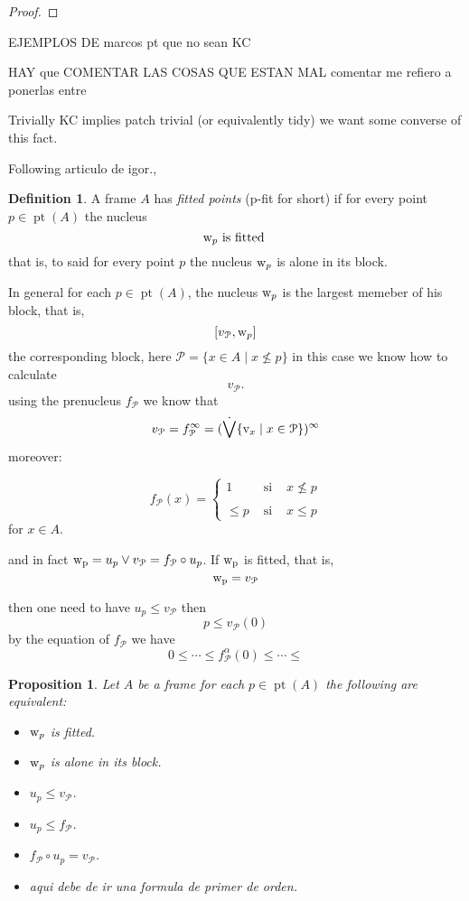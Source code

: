 \documentclass[11pt]{amsart}
\DeclareMathOperator{\pt}{pt}
\theoremstyle{plain}
\newtheorem{prop}[thm]{Proposition}
\theoremstyle{definition}
\newtheorem{dfn}[thm]{Definition}
\begin{document}
\begin{proof}



\end{proof}

EJEMPLOS DE marcos pt que no sean KC

HAY que COMENTAR LAS COSAS QUE ESTAN MAL comentar me refiero a ponerlas entre 

	



Trivially {\rm KC} implies patch trivial (or equivalently tidy) we want some converse of this fact.



Following articulo de igor.,

\begin{dfn}\label{pfit}
A frame $A$ has \emph{fitted points} ({\rm p-fit} for short) if for every point $p\in\pt(A)$ the nucleus \[{\rm w}_{p} \text{ is fitted }\]
that is, to said for every point $p$ the nucleus ${\rm w}_{p}$ is alone in its block.
\end{dfn}



In general for each $p\in\pt(A)$, the nucleus ${\rm w}_{p}$ is the largest memeber of his block, that is,
\[[v_{\mathcal{P}},{\rm w}_{p}]\] the corresponding block, here $\mathcal{P}=\{x\in A\mid x\nleq p\}$ 
in this case we know how to calculate \[v_{\mathcal{P}}.\] using the prenucleus $f_{\mathcal{P}}$
we know that \[v_{\mathcal{P}}=f_{\mathcal{P}}^{\infty}=(\dot{\bigvee}\{{\rm v}_{x}\mid x\in\mathcal{P}\})^{\infty}\]
moreover:

\[
f_{\mathcal{P}}(x)=\left\{
	\begin{array}{lcc}
1 & \mbox{ si } & x\nleq p\\
\\
\leq p & \mbox{ si } & x\leq p
\end{array}\right.
\]
for $x\in A$.


and in fact ${\rm w_{p}}=u_{p}\vee v_{\mathcal{P}}=f_{\mathcal{P}}\circ u_{p}$. If ${\rm w_{p}}$ is fitted, that is, \[{\rm w_{p}}=v_{\mathcal{P}}\]

then one need to have $u_{p}\leq v_{\mathcal{P}}$ then \[p\leq v_{\mathcal{P}}(0)\] by the equation of $f_{\mathcal{P}}$ we have \[0\leq\cdots\leq f_{\mathcal{P}}^{\alpha}(0)\leq\cdots\leq\]


\begin{prop}\label{pfitequiv}
Let $A$ be a frame for each $p\in\pt(A)$ the following are equivalent:
 \begin{itemize}
\item[(i)] ${\rm w}_{p}$ is fitted.
\item[(ii)] ${\rm w}_{p}$ is alone in its block.
\item[(iii)] $u_{p}\leq v_{\mathcal{P}}$.
\item[(iv)] $u_{p}\leq f_{\mathcal{P}}$.
\item[(v)] $f_{\mathcal{P}}\circ u_{p}=v_{\mathcal{P}}$.
\item[(vi)] aqui debe de ir una formula de primer de orden.
 \end{itemize}
\end{prop}	
\end{document}
